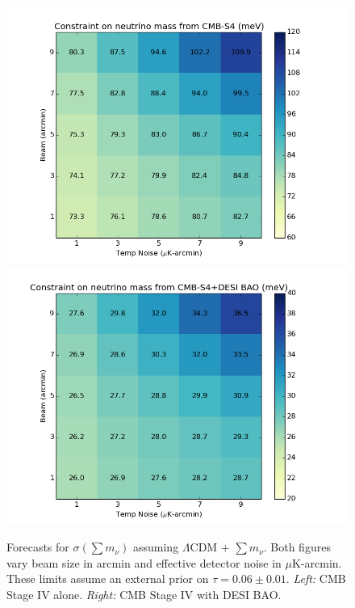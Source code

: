 \begin{figure}[h!]
\begin{center}
\includegraphics[scale=0.4]{Neutrinos/S4_BeamVsNoise.png} \hspace{0.025cm}
\includegraphics[scale=0.4]{Neutrinos/S4+DESI_BeamVsNoise.png}

\caption{ Forecasts for $\sigma(\sum m_\nu)$ assuming $\Lambda$CDM + $\sum m_\nu$.  Both figures vary beam size in arcmin and effective detector noise in $\mu$K-arcmin.  These limits assume an external prior on $\tau = 0.06 \pm 0.01$. {\it Left:} CMB Stage IV alone. {\it Right: } CMB Stage IV with DESI BAO.  }
\label{fig:mnuforecast}
\end{center}
\end{figure} 

